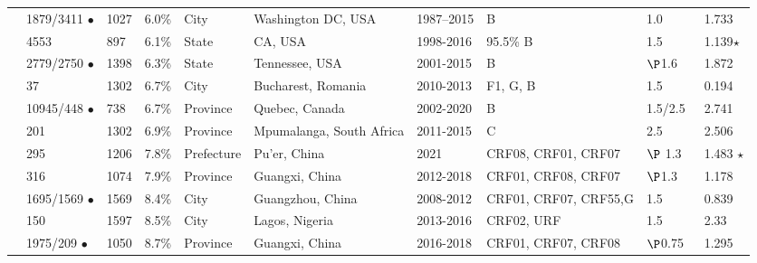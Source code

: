 \documentclass[utf8]{FrontiersinHarvard} %
\begin{document}
\begin{table}[h]
\begin{ssmall}
\begin{tabular}{llllllllll}
			\cite{Perez-Losada:2017aa}  & 1879/3411 $\bullet$ & 1027 & 6.0\%  & City       & Washington DC, USA       & 1987–2015 & B                     & 1.0                                        & 1.733          \\
			\cite{rhee_national_2019}   & 4553                & 897  & 6.1\%  & State      & CA, USA                  & 1998-2016 & 95.5\% B              & 1.5                                        & 1.139$\star$   \\
			\cite{chato_public_2020}    & 2779/2750 $\bullet$ & 1398 & 6.3\%  & State      & Tennessee, USA           & 2001-2015 & B                     & $\P$1.6                                    & 1.872          \\
			\cite{Temereanca:2017aa}    & 37                  & 1302 & 6.7\%  & City       & Bucharest, Romania       & 2010-2013 & F1, G, B              & 1.5                                        & 0.194          \\
			\cite{brenner_role_2021}    & 10945/448 $\bullet$ & 738  & 6.7\%  & Province   & Quebec, Canada           & 2002-2020 & B                     & 1.5/2.5\                                   & 2.741          \\
			\citet{sivay_hiv-1_2018}    & 201                 & 1302 & 6.9\%  & Province   & Mpumalanga, South Africa & 2011-2015 & C                     & 2.5                                        & 2.506          \\
			\cite{Li:2022aa}            & 295                 & 1206 & 7.8\%  & Prefecture & Pu'er, China             & 2021      & CRF08, CRF01, CRF07   & $\P$ 1.3                                   & 1.483  $\star$ \\
			\cite{Yu:2022aa}            & 316                 & 1074 & 7.9\%  & Province   & Guangxi, China           & 2012-2018 & CRF01, CRF08, CRF07   & $\P$1.3                                    & 1.178          \\
			\cite{Yan:2021aa}           & 1695/1569 $\bullet$ & 1569 & 8.4\%  & City       & Guangzhou, China         & 2008-2012 & CRF01, CRF07, CRF55,G & 1.5                                        & 0.839          \\
			\cite{Billings:2019aa}      & 150                 & 1597 & 8.5\%  & City       & Lagos, Nigeria           & 2013-2016 & CRF02, URF            & 1.5                                        & 2.33           \\
			\cite{Chen:2023aa}          & 1975/209  $\bullet$ & 1050 & 8.7\%  & Province   & Guangxi, China           & 2016-2018 & CRF01, CRF07, CRF08   & $\P$0.75                                   & 1.295          \\

\end{tabular}
\end{ssmall}
\end{table}
\end{document}
